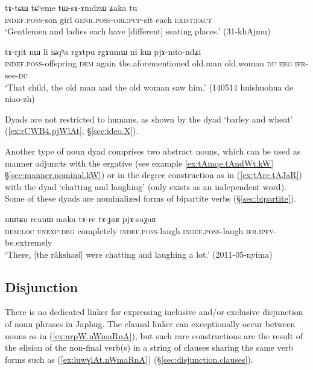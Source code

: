 \begin{exe}
\ex \label{ex:tAtCW.tCheme.tWsAmdzW}
 \gll  tɤ-tɕɯ tɕʰeme tɯ-sɤ-ɤmdzɯ ʑaka tu \\
 \textsc{indef}.\textsc{poss}-son girl \textsc{genr}.\textsc{poss}-\textsc{obl}:\textsc{pcp}-sit each \textsc{exist}:\textsc{fact} \\
\glt `Gentlemen and ladies each have [different] seating places.' (31-khAjmu)
\end{exe}

\begin{exe}
\ex \label{ex:rgAtpu.rgAnmW}
 \gll tɤ-rɟit nɯ li iɕqʰa rgɤtpu rgɤnmɯ ni kɯ pjɤ-mto-ndʑi \\
 \textsc{indef}.\textsc{poss}-offspring \textsc{dem} again the.aforementioned  old.man old.woman \textsc{du} \textsc{erg} \textsc{ifr}-see-\textsc{du} \\
\glt `That child, the old man and the old woman saw him.' (140514 huishuohua de niao-zh)
\end{exe}

Dyads are not restricted to humans, as shown by the dyad  `barley and wheat' (\ref{ex:rCWB4.pjWlAt}, §\ref{sec:ideo.X}).

Another type of noun dyad comprises two abstract nouns, which can be used as manner adjuncts with the ergative (see example \ref{ex:tAmqe.tAndWt.kW} §\ref{sec:manner.nominal.kW}) or in the degree construction as in (\ref{ex:tAre.tAJaR}) with the dyad  `chatting and laughing' (only  exists as an independent word). Some of these dyads are nominalized forms of bipartite verbs (§\ref{sec:bipartite}).

\begin{exe}
\ex \label{ex:tAre.tAJaR}
 \gll  nɯtɕu rcanɯ maka tɤ-re tɤ-ɟaʁ pjɤ-saχaʁ \\
 \textsc{dem}:\textsc{loc} \textsc{unexp}:\textsc{deg} completely \textsc{indef}.\textsc{poss}-laugh \textsc{indef}.\textsc{poss}-laugh  \textsc{ifr}.\textsc{ipfv}-be.extremely \\
 \glt `There, [the râkshasî] were chatting and laughing a lot.' (2011-05-nyima)
\end{exe}

\subsection{Disjunction}  \label{sec:disjunction.nouns}
There is no dedicated linker for expressing inclusive and/or exclusive disjunction of noun phrases in Japhug. The clausal linker  can exceptionally occur between nouns as in (\ref{ex:arpW.nWmaRnA}), but such rare constructions are the result of the elision of the non-final verb(s) in a string of clauses sharing the same verb forms such as (\ref{ex:luwɣlAt.nWmaRnA}) (§\ref{sec:disjunction.clauses}).

